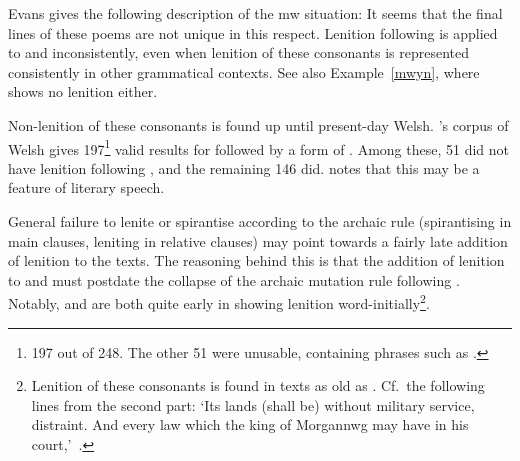 Evans gives the following description of the \gls{mw} situation:
It seems that the final lines of these poems are not unique in this respect. Lenition following  is applied to  and  inconsistently, even when lenition of these consonants is  represented consistently in other grammatical contexts. See also Example~\ref{mwyn}, where  shows no lenition either.

Non-lenition of these consonants is found up until present-day Welsh. \Textcite{ellis_cronfa_2001}'s corpus of Welsh gives 197\footnote{197 out of 248. The other 51 were unusable, containing phrases such as .} valid results for  followed by a form of . Among these, 51 did not have lenition following , and the remaining 146 did. \Textcite[695]{thomas_gramadeg_1996} notes that this may be a feature of literary speech.

General failure to lenite or spirantise according to the archaic rule (spirantising in main clauses, leniting in relative clauses) may point towards a fairly late addition of lenition to the texts. The reasoning behind this is that the addition of lenition to  and  must postdate the collapse of the archaic mutation rule following . Notably,  and  are both quite early in showing lenition word-initially\footnote{Lenition of these consonants is found  in texts as old as . Cf.\ the following lines from the second part:  `Its lands (shall be) without military service, distraint. And every law which the king of Morgannwg may have in his court,'~\autocite[135--136]{davies_braint_1974}.}.

